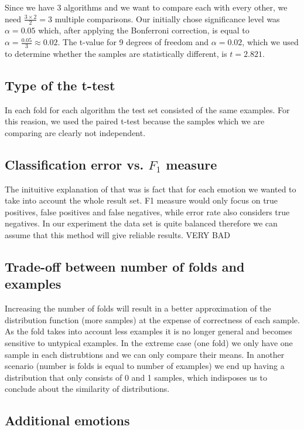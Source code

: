 \documentclass[a4paper]{article}
\begin{document}
Since we have 3 algorithms and we want to compare each with every other, we need $\frac{3 \times 2}{2} = 3$ multiple comparisons. Our initially chose significance level was $\alpha = 0.05$ which, after applying the Bonferroni correction, is equal to $\alpha = \frac{0.05}{3} \approx 0.02$. The t-value for 9 degrees of freedom and $\alpha = 0.02$, which we used to determine whether the samples are statistically different, is $t = 2.821$.

\subsection{Type of the t-test}

In each fold for each algorithm the test set consisted of the same examples. For this reasion, we used the paired t-test because the samples which we are comparing are clearly not independent.

\subsection{Classification error vs. $F_1$ measure}

The inituitive explanation of that was is fact that for each emotion we wanted to take into account the whole result set. F1 measure would only focus on true positives, false positives and false negatives, while error rate also considers true negatives. In our experiment the data set is quite balanced therefore we can assume that this method will give reliable results. VERY BAD


\subsection{Trade-off between number of folds and examples}

Increasing the number of folds will result in a better approximation of the distribution function (more samples) at the expense of correctness of each sample. As the fold takes into account less examples it is no longer general and becomes sensitive to untypical examples. In the extreme case (one fold) we only have one sample in each distrubtions and we can only compare their means. In another scenario (number is folds is equal to number of examples) we end up having a distribution that only consists of 0 and 1 samples, which indisposes us to conclude about the similarity of distributions.

\subsection{Additional emotions}
\end{document}
